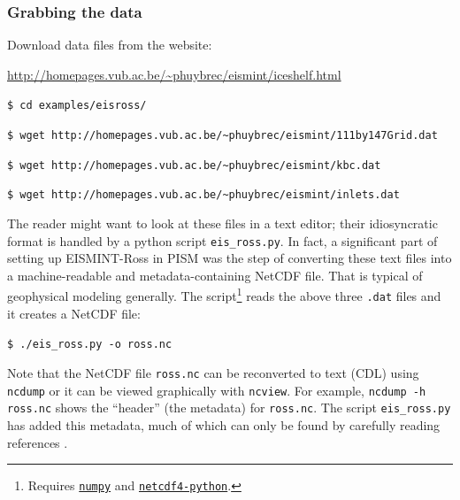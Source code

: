 \documentclass[11pt,final]{amsart}
\begin{document}
\subsubsection*{Grabbing the data}  Download data files from the website:

\centerline{\url{http://homepages.vub.ac.be/~phuybrec/eismint/iceshelf.html}}
\small

\verb|$ cd examples/eisross/|

\verb|$ wget http://homepages.vub.ac.be/~phuybrec/eismint/111by147Grid.dat|

\verb|$ wget http://homepages.vub.ac.be/~phuybrec/eismint/kbc.dat|

\verb|$ wget http://homepages.vub.ac.be/~phuybrec/eismint/inlets.dat|

\normalsize\noindent The reader might want to look at these files in a text editor; their idiosyncratic format is handled by a python script \verb|eis_ross.py|.  In fact, a significant part of setting up EISMINT-Ross in PISM was the step of converting these text files into a machine-readable and metadata-containing NetCDF file.  That is typical of geophysical modeling generally.  The script\footnote{Requires \href{http://numpy.scipy.org/}{\texttt{numpy}} and \href{http://code.google.com/p/netcdf4-python/}{\texttt{netcdf4-python}}.} reads the above three \verb|.dat| files and it creates a NetCDF file:

\verb|$ ./eis_ross.py -o ross.nc|

\noindent Note that the NetCDF file \verb|ross.nc| can be reconverted to text (CDL) using \verb|ncdump| or it can be viewed graphically with \verb|ncview|.  For example, \verb|ncdump -h ross.nc| shows the ``header'' (the metadata) for \verb|ross.nc|.  The script \verb|eis_ross.py| has added this metadata, much of which can only be found by carefully reading references \cite{RIGGS2,RIGGS1,MacAyealetal}.
\end{document}
